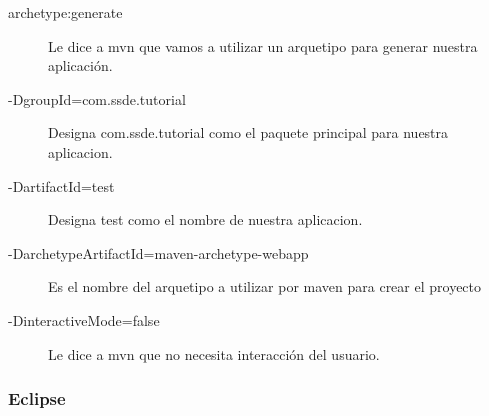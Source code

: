 \documentclass[12pt]{article}
\begin{document}
		\begin{description}
		\item [archetype:generate] Le dice a mvn que vamos a utilizar un arquetipo para generar nuestra aplicaci\'on.
		\item[-DgroupId=com.ssde.tutorial] Designa com.ssde.tutorial como el paquete principal para nuestra aplicacion.
		\item[-DartifactId=test] Designa test como el nombre de nuestra aplicacion.
		\item[-DarchetypeArtifactId=maven-archetype-webapp] Es el nombre del arquetipo a utilizar por maven para crear el proyecto
		\item[-DinteractiveMode=false] Le dice a mvn que no necesita interacci\'on del usuario.
		\end{description}
		\subsubsection{Eclipse}
		
\end{document}
